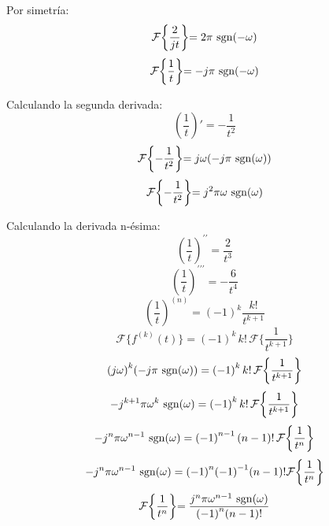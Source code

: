 Por simetría:
\begin{equation*}
    \mathcal{F}\biggl\{\frac{2}{jt}\biggl\}=2\pi\,\operatorname{sgn}(-\omega)
\end{equation*}
\begin{equation}
    \mathcal{F}\biggl\{\frac{1}{t}\biggl\}=-j\pi\,\operatorname{sgn}(-\omega)
\end{equation}

Calculando la segunda derivada:
\begin{equation*}
    \left(\frac{1}{t}\right)'=-\frac{1}{t^2}
\end{equation*}
\begin{equation*}
    \mathcal{F}\biggl\{-\frac{1}{t^2}\biggl\}=j\omega(-j\pi\,\operatorname{sgn}(\omega))
\end{equation*}
\begin{equation*}
    \mathcal{F}\biggl\{-\frac{1}{t^2}\biggl\}=j^2\pi\omega\,\operatorname{sgn}(\omega)
\end{equation*}

Calculando la derivada n-ésima:
\begin{equation*}
    {\left(\frac{1}{t}\right)}^{\prime\prime}=\frac{2}{t^3}
\end{equation*}
\begin{equation*}
    {\left(\frac{1}{t}\right)}^{\prime\prime\prime}=-\frac{6}{t^4}
\end{equation*}
\begin{equation*}
    {\left(\frac{1}{t}\right)}^{(n)}={(-1)}^k\frac{k!}{t^{k+1}}
\end{equation*}
\begin{equation*}
    \mathcal{F}\{f^{(k)}(t)\}={(-1)}^k\,k!\,\mathcal{F}\biggl\{\frac{1}{t^{k+1}}\biggl\}
\end{equation*}
\begin{equation*}
    {(j\omega)}^k(-j\pi\,\operatorname{sgn}(\omega))={(-1)}^k\,k!\,\mathcal{F}\biggl\{\frac{1}{t^{k+1}}\biggl\}
\end{equation*}
\begin{equation*}
    -j^{k+1}\pi\omega^k\,\operatorname{sgn}(\omega)={(-1)}^k\,k!\,\mathcal{F}\biggl\{\frac{1}{t^{k+1}}\biggl\}
\end{equation*}
\begin{equation*}
    -j^n\pi\omega^{n-1}\,\operatorname{sgn}(\omega)={(-1)}^{n-1}\,(n-1)!\,\mathcal{F}\biggl\{\frac{1}{t^n}\biggl\}
\end{equation*}
\begin{equation*}
    -j^n\pi\omega^{n-1}\,\operatorname{sgn}(\omega)={(-1)}^n{(-1)}^{-1}(n-1)!\mathcal{F}\biggl\{\frac{1}{t^n}\biggl\}
\end{equation*}
\begin{equation}
    \mathcal{F}\biggl\{\frac{1}{t^n}\biggl\}=\frac{j^n\pi{\omega}^{n-1}\,\operatorname{sgn}(\omega)}{{(-1)}^n(n-1)!}
\end{equation}

